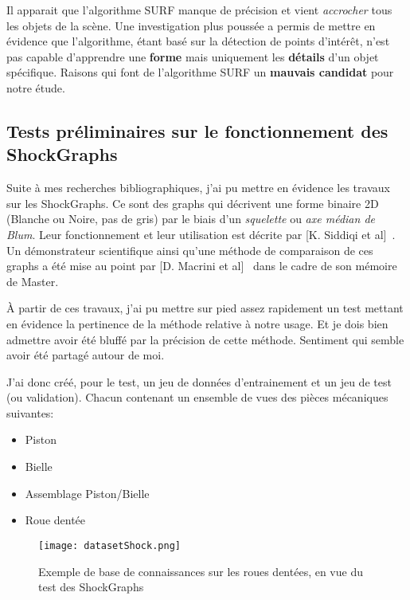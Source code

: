 Il apparait que l'algorithme SURF manque de précision et vient \textit{accrocher} tous les objets de la scène. Une investigation plus poussée a permis de mettre en évidence que l'algorithme, étant basé sur la détection de points d'intérêt, n'est pas capable d'apprendre une \textbf{forme} mais uniquement les \textbf{détails} d'un objet spécifique. Raisons qui font de l'algorithme SURF un \textbf{mauvais candidat} pour notre étude.

\clearpage
\subsection{Tests préliminaires sur le fonctionnement des ShockGraphs}

Suite à mes recherches bibliographiques, j'ai pu mettre en évidence les travaux sur les ShockGraphs. Ce sont des graphs qui décrivent une forme binaire 2D (Blanche ou Noire, pas de gris) par le biais d'un \textit{squelette} ou \textit{axe médian de Blum}. Leur fonctionnement et leur utilisation est décrite par [K. Siddiqi et al]~\cite{Siddiqi1999}. Un démonstrateur scientifique ainsi qu'une méthode de comparaison de ces graphs a été mise au point par [D. Macrini et al]~\cite{Macrini2002} dans le cadre de son mémoire de Master.

À partir de ces travaux, j'ai pu mettre sur pied assez rapidement un test mettant en évidence la pertinence de la méthode relative à notre usage. Et je dois bien admettre avoir été bluffé par la précision de cette méthode. Sentiment qui semble avoir été partagé autour de moi.

J'ai donc créé, pour le test, un jeu de données d'entrainement et un jeu de test (ou validation). Chacun contenant un ensemble de vues des pièces mécaniques suivantes:
\begin{itemize}
	\item 	Piston
	\item	Bielle
	\item	Assemblage Piston/Bielle
	\item	Roue dentée
\end{itemize}
\vspace{5mm}

\begin{figure}[H]
    \centering
    \texttt{[image: datasetShock.png]}
	\caption{Exemple de base de connaissances sur les roues dentées, en vue du test des ShockGraphs}\label{image.ShockGearDataset} 
\end{figure}
\vspace{-4mm}

